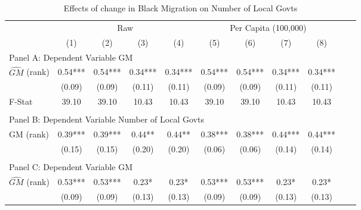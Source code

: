  \begin{table}[htbp]\centering {} \begin{threeparttable} \caption{Effects of change in Black Migration on Number of Local Govts} \begin{tabular}{l*{10}{c}} \toprule
                &\multicolumn{4}{c}{Raw}                                    &\multicolumn{4}{c}{Per Capita (100,000)}                   \\\cmidrule(lr){2-5}\cmidrule(lr){6-9}
                &\multicolumn{1}{c}{(1)}   &\multicolumn{1}{c}{(2)}   &\multicolumn{1}{c}{(3)}   &\multicolumn{1}{c}{(4)}   &\multicolumn{1}{c}{(5)}   &\multicolumn{1}{c}{(6)}   &\multicolumn{1}{c}{(7)}   &\multicolumn{1}{c}{(8)}   \\
\cmidrule(lr){1-9}
\multicolumn{8}{l}{Panel A: Dependent Variable GM}\\
\cmidrule(lr){1-9}
$\hat{GM}$ (rank)&       0.54***&       0.54***&       0.34***&       0.34***&       0.54***&       0.54***&       0.34***&       0.34***\\
                &     (0.09)   &     (0.09)   &     (0.11)   &     (0.11)   &     (0.09)   &     (0.09)   &     (0.11)   &     (0.11)   \\
\midrule
F-Stat          &      39.10   &      39.10   &      10.43   &      10.43   &      39.10   &      39.10   &      10.43   &      10.43   \\
\cmidrule[\heavyrulewidth](lr){1-9} \\ \cmidrule[\heavyrulewidth](lr){1-9}
\multicolumn{8}{l}{Panel B: Dependent Variable Number of Local Govts}\\
\cmidrule(lr){1-9}
GM  (rank)      &       0.39***&       0.39***&       0.44** &       0.44** &       0.38***&       0.38***&       0.44***&       0.44***\\
                &     (0.15)   &     (0.15)   &     (0.20)   &     (0.20)   &     (0.06)   &     (0.06)   &     (0.14)   &     (0.14)   \\
\cmidrule[\heavyrulewidth](lr){1-9} \\ \cmidrule[\heavyrulewidth](lr){1-9}
\multicolumn{8}{l}{Panel C: Dependent Variable GM}\\
\cmidrule(lr){1-9}
$\hat{GM}$ (rank)&       0.53***&       0.53***&       0.23*  &       0.23*  &       0.53***&       0.53***&       0.23*  &       0.23*  \\
                &     (0.09)   &     (0.09)   &     (0.13)   &     (0.13)   &     (0.09)   &     (0.09)   &     (0.13)   &     (0.13)   \\

\end{tabular}
\end{threeparttable}
\end{table}
